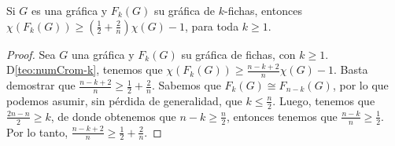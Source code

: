 \begin{teorema}
\label{teo:numCrom indep-k}
    Si $G$ es una gr\'afica y $F_k(G)$ su gr\'afica de $k$-fichas, entonces
    \linebreak
    $\chi (F_k(G)) \geq (\frac{1}{2}+ \frac{2}{n})\chi(G) -1 $, para toda $k
    \geq 1$.
\end{teorema}
    
\begin{proof}
    Sea $G$ una gr\'afica y $F_k(G)$ su gr\'afica de fichas, con $k \geq 1$.
    D\cref{teo:numCrom-k}, tenemos que $\chi(F_k(G)) \geq \frac{n-k+2}{n}
    \chi(G) -1$. Basta demostrar que $\frac{n-k+2}{n} \geq
    \frac{1}{2}+\frac{2}{n}$. Sabemos que $F_k(G) \cong F_{n-k}(G)$, por lo que
    podemos asumir, sin p\'erdida de generalidad, que $k\leq \frac{n}{2}$.
    Luego, tenemos que $\frac{2n-n}{2}\geq k$, de donde obtenemos que $n-k \geq
    \frac{n}{2}$, entonces tenemos que $\frac{n-k}{n}\geq \frac{1}{2}$. Por lo
    tanto, $\frac{n-k+2}{n} \geq \frac{1}{2}+\frac{2}{n}$.
\end{proof}